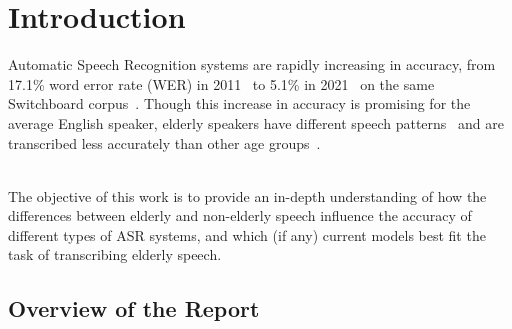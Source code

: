 \chapter{Introduction}\label{ch:introduction}

Automatic Speech Recognition systems are rapidly increasing in accuracy, from 17.1\% word error
rate (WER) in 2011~\cite{seide2011} to 5.1\% in 2021~\cite{Ng2021} on the same Switchboard
corpus~\cite{switchboard}.
Though this increase in accuracy is promising for the average English speaker, elderly speakers
have different speech patterns~\cite{Horton2010} and are transcribed less accurately than other age
groups~\cite{picone1990}.

\\
The objective of this work is to provide an in-depth understanding of how the differences
between elderly and non-elderly speech influence the accuracy of different types of ASR systems,
and which (if any) current models best fit the task of transcribing elderly speech.

\section{Overview of the Report}\label{sec:overview-of-the-report}

